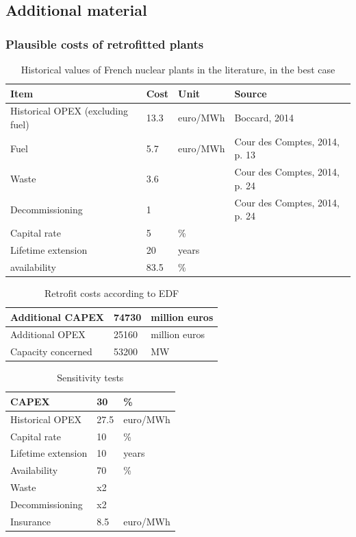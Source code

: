 \clearpage
\subsection{Additional material}

\subsubsection{Plausible costs of retrofitted plants}

\begin{table}[!htp]
	\centering
	\caption{Historical values of French nuclear plants in the literature, in the best case}
	\label{tab:historical_costs}
	\begin{tabular}{llll}
		\toprule
		Item & Cost & Unit & Source \\
		\midrule
		Historical OPEX (excluding fuel) & 13.3 & euro/MWh & Boccard, 2014 \\
		Fuel & 5.7 & euro/MWh & Cour des Comptes, 2014, p. 13 \\
		Waste & 3.6 &  & Cour des Comptes, 2014, p. 24 \\
		Decommissioning & 1 &  & Cour des Comptes, 2014, p. 24 \\
		Capital rate & 5 & \% &  \\
		Lifetime extension & 20 & years & \\
		availability & 83.5 & \% & \\
		\bottomrule
	\end{tabular}
\end{table}


\begin{table}[!htp]
	\centering
	\caption{Retrofit costs according to EDF}
	\label{tab:costs_grand_carenage}
	\begin{tabular}{lll}
		\toprule
		Additional CAPEX & 74730 & million euros \\
		\midrule
		Additional OPEX & 25160 & million euros \\
		Capacity concerned & 53200 & MW \\
		\bottomrule
	\end{tabular}
\end{table}


\begin{table}[!htp]
	\centering
	\caption{Sensitivity tests}
	\label{tab:sensitivity_tests}
	\begin{tabular}{lll}
		\toprule
		CAPEX & 30 & \% \\
		\midrule
		Historical OPEX & 27.5 & euro/MWh \\
		Capital rate & 10 & \% \\
		Lifetime extension & 10 & years \\
		Availability & 70 & \% \\
		Waste & x2 &  \\
		Decommissioning & x2 &  \\
		Insurance & 8.5 & euro/MWh \\
		\bottomrule
	\end{tabular}
\end{table}

